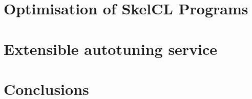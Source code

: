 \chapter{Optimisation of SkelCL Programs}\label{chap:methodology}


%
\chapter{Extensible autotuning service}\label{chap:autotune}



%
\chapter{Conclusions}\label{chap:conclusions}



\clearpage
\label{bibliography}
\printbibliography


